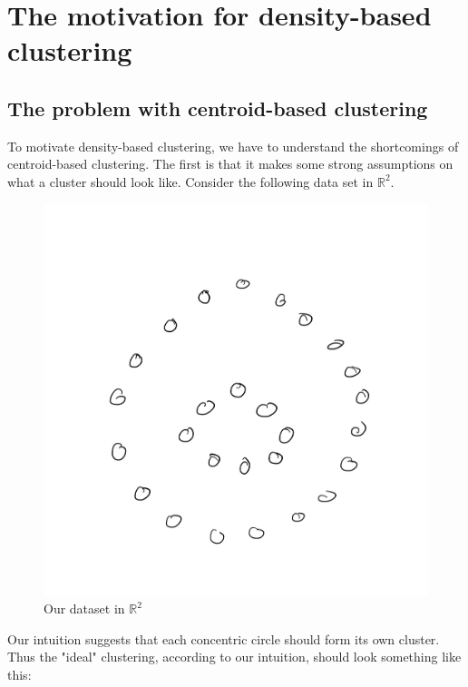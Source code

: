 \section{The motivation for density-based clustering}
  \subsection{The problem with centroid-based clustering}

To motivate density-based clustering, we have to understand the
shortcomings of centroid-based clustering. The first is that it makes
some strong assumptions on what a cluster should look like. Consider the following data set
in $\mathbb{R}^2$.

\begin{figure}
\begin{center}
\includegraphics[width=.7\linewidth]{chapter_2/files/raw.jpg}
\end{center}
\caption{Our dataset in $\mathbb{R}^2$}
\end{figure}

Our intuition suggests that each concentric circle should form its own cluster.
Thus the "ideal" clustering, according to our intuition, should look something
like this:

